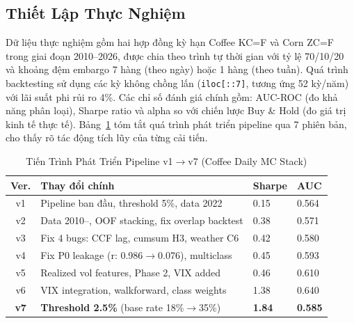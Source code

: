 \documentclass[conference]{IEEEtran}
\begin{document}
\subsection{Thiết Lập Thực Nghiệm}
Dữ liệu thực nghiệm gồm hai hợp đồng kỳ hạn Coffee KC=F và Corn ZC=F trong
giai đoạn 2010--2026, được chia theo trình tự thời gian với tỷ lệ 70/10/20 và
khoảng đệm embargo 7 hàng (theo ngày) hoặc 1 hàng (theo tuần). Quá trình
backtesting sử dụng các kỳ không chồng lấn (\texttt{iloc[::7]}, tương ứng 52
kỳ/năm) với lãi suất phi rủi ro 4\%. Các chỉ số đánh giá chính gồm: AUC-ROC
(đo khả năng phân loại), Sharpe ratio và alpha so với chiến lược Buy \& Hold
(đo giá trị kinh tế thực tế).
Bảng~\ref{tab:pipeline_evolution} tóm tắt quá trình phát triển pipeline qua
7 phiên bản, cho thấy rõ tác động tích lũy của từng cải tiến.
\begin{table}[t]
\caption{Tiến Trình Phát Triển Pipeline v1$\to$v7 (Coffee Daily MC Stack)}
\label{tab:pipeline_evolution}
\centering
\begin{tabular}{@{}clll@{}}
\toprule
\textbf{Ver.} & \textbf{Thay đổi chính} & \textbf{Sharpe} & \textbf{AUC} \\
\midrule
v1 & Pipeline ban đầu, threshold 5\%, data 2022 & 0.15 & 0.564 \\
v2 & Data 2010--, OOF stacking, fix overlap backtest & 0.38 & 0.571 \\
v3 & Fix 4 bugs: CCF lag, cumsum H3, weather C6 & 0.42 & 0.580 \\
v4 & Fix P0 leakage (r: 0.986$\to$0.076), multiclass & 0.45 & 0.593 \\
v5 & Realized vol features, Phase 2, VIX added & 0.46 & 0.610 \\
v6 & VIX integration, walkforward, class weights & 1.38 & 0.640 \\
\textbf{v7} & \textbf{Threshold 2.5\%} (base rate 18\%$\to$35\%) & \textbf{1.84} & \textbf{0.585} \\
\bottomrule
\end{tabular}
\end{table}
\end{document}
